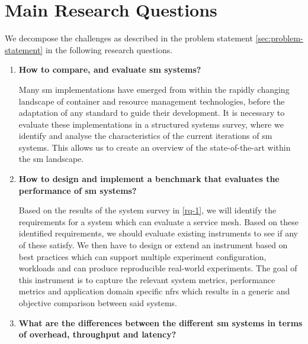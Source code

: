 \section{Main Research Questions}
\label{sec:research-questions}

We decompose the challenges as described in the problem statement \cref{sec:problem-statement} in the following research questions.




\begin{enumerate}[label=\textbf{RQ\arabic*}, leftmargin=3\parindent]
    \item \textbf{How to compare, and evaluate \gls{sm} systems?}
    \label{rq-1}
    
    Many \gls{sm} implementations have emerged from within the rapidly changing landscape of container and resource management technologies, before the adaptation of any standard to guide their development. It is necessary to evaluate these implementations in a structured systems survey, where we identify and analyse the characteristics of the current iterations of \gls{sm} systems. This allows us to create an overview of the state-of-the-art within the \gls{sm} landscape.
    
    \item \textbf{How to design and implement a benchmark that evaluates the performance of \gls{sm} systems?}
    \label{rq-2}
    
    Based on the results of the system survey in \ref{rq-1}, we will identify the requirements for a system which can evaluate a service mesh. Based on these identified requirements, we should evaluate existing instruments to see if any of these satisfy. We then have to design or extend an instrument based on best practices \cite{folkerts2012benchmarking} which can support multiple experiment configuration, workloads and can produce reproducible real-world experiments. The goal of this instrument is to capture the relevant system metrics, performance metrics and application domain specific \glspl{nfr} which results in a generic and objective comparison between said systems.

    \item \textbf{What are the differences between the different \gls{sm} systems in terms of overhead, throughput and latency?}
    \label{rq-3}
    

\end{enumerate}
